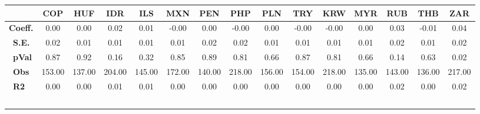 \begin{tabular}{l|cccccccccccccc}
\hline
&\textbf{COP}&\textbf{HUF}&\textbf{IDR}&\textbf{ILS}&\textbf{MXN}&\textbf{PEN}&\textbf{PHP}&\textbf{PLN}&\textbf{TRY}&\textbf{KRW}&\textbf{MYR}&\textbf{RUB}&\textbf{THB}&\textbf{ZAR}\\\hline
\textbf{Coeff.}&0.00&0.00&0.02&0.01&-0.00&0.00&-0.00&0.00&-0.00&-0.00&0.00&0.03&-0.01&0.04\\\
\textbf{S.E.}&0.02&0.01&0.01&0.01&0.01&0.02&0.02&0.01&0.01&0.01&0.01&0.02&0.01&0.02\\\
\textbf{pVal}&0.87&0.92&0.16&0.32&0.85&0.89&0.81&0.66&0.87&0.81&0.66&0.14&0.63&0.02\\\
\textbf{Obs}&153.00&137.00&204.00&145.00&172.00&140.00&218.00&156.00&154.00&218.00&135.00&143.00&136.00&217.00\\\
\textbf{R2}&0.00&0.00&0.01&0.01&0.00&0.00&0.00&0.00&0.00&0.00&0.00&0.02&0.00&0.02\\\
\end{tabular}
